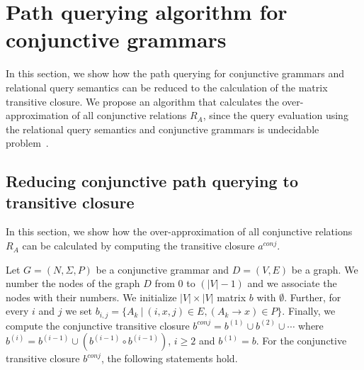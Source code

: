 \section{Path querying algorithm for conjunctive grammars}  \label{section_main}
In this section, we show how the path querying for conjunctive grammars and relational query semantics can be reduced to the calculation of the matrix transitive closure. We propose an algorithm that calculates the over-approximation of all conjunctive relations $R_A$, since the query evaluation using the relational query semantics and conjunctive grammars is undecidable problem~\cite{hellingsRelational}.

\subsection{Reducing conjunctive path querying to transitive closure} \label{section_reducing_conj}
In this section, we show how the over-approximation of all conjunctive relations $R_A$ can be calculated by computing the transitive closure $a^{conj}$.

Let $G = (N,\Sigma,P)$ be a conjunctive grammar and $D = (V, E)$ be a graph. We number the nodes of the graph $D$ from 0 to $(|V| - 1)$ and we associate the nodes with their numbers. We initialize $|V| \times |V|$ matrix $b$ with $\emptyset$. Further, for every $i$ and $j$ we set $b_{i,j} = \{A_k~|~(i,x,j) \in E, (A_k \rightarrow x) \in P\}$. Finally, we compute the conjunctive transitive closure $b^{conj} = b^{(1)} \cup b^{(2)} \cup \cdots$ where $b^{(i)} = b^{(i-1)} \cup (b^{(i-1)} \circ b^{(i-1)})$, $i \ge 2$ and $b^{(1)} = b$. For the conjunctive transitive closure $b^{conj}$, the following statements hold.

